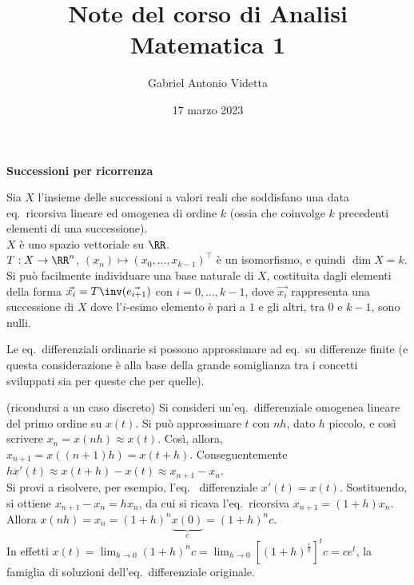 \documentclass[11pt]{article}
\title{\textbf{Note del corso di Analisi Matematica 1}}
\author{Gabriel Antonio Videtta}
\date{17 marzo 2023}
\begin{document}
\maketitle

\begin{center}
    \Large \textbf{Successioni per ricorrenza}
\end{center}

\begin{remark}
Sia $X$ l'insieme delle successioni a valori reali che soddisfano una data
eq.~ricorsiva lineare ed omogenea di ordine $k$ (ossia che coinvolge
$k$ precedenti elementi di una successione). \\

\li $X$ è uno spazio vettoriale su $\RR$. \\
\li $T : X \to \RR^n$, $(x_n) \mapsto (x_0, ..., x_{k-1})^\top$ è
un isomorfismo, e quindi $\dim X = k$. \\
\li Si può facilmente individuare una base naturale di $X$, costituita dagli
elementi della forma $\vec{x_i} = T\inv(\vec{e_ {i + 1}})$ con $i = 0, ..., k - 1$,
dove $\vec{x_i}$ rappresenta una successione di $X$ dove l'$i$-esimo elemento
è pari a $1$ e gli altri, tra $0$ e $k-1$, sono nulli.
\end{remark}

\begin{remark}
Le eq.~differenziali ordinarie si possono approssimare
ad eq.~su differenze finite (e questa considerazione è
alla base della grande somiglianza tra i concetti sviluppati
sia per queste che per quelle).
\end{remark}

\begin{example} (ricondursi a un caso discreto) 
Si consideri un'eq.~differenziale omogenea lineare del primo
ordine su $x(t)$. Si può approssimare $t$ con $nh$, dato
$h$ piccolo, e così scrivere $x_n = x(nh) \approx x(t)$.
Così, allora, $x_{n+1} = x((n+1)h) = x(t + h)$. Conseguentemente $h
x'(t) \approx x(t + h) - x(t) \approx x_{n+1} - x_n$. \\

Si provi a risolvere, per esempio, l'eq.~ differenziale $x'(t) = x(t)$.
Sostituendo, si ottiene $x_{n+1} - x_n = h x_n$, da cui
si ricava l'eq.~ricorsiva $x_{n+1} = (1 + h) x_n$. Allora
$x(nh) = x_n = (1 + h)^n \underbrace{x(0)}_c = (1 + h)^n c$. \\

In effetti $x(t) = \displaystyle \lim_{h \to 0} (1 + h)^n c =
\lim_{h \to 0} \left[(1 + h)^{\frac{1}{h}}\right]^t c = c e^t$,
la famiglia di soluzioni dell'eq.~differenziale originale.
\end{example}
\end{document}
